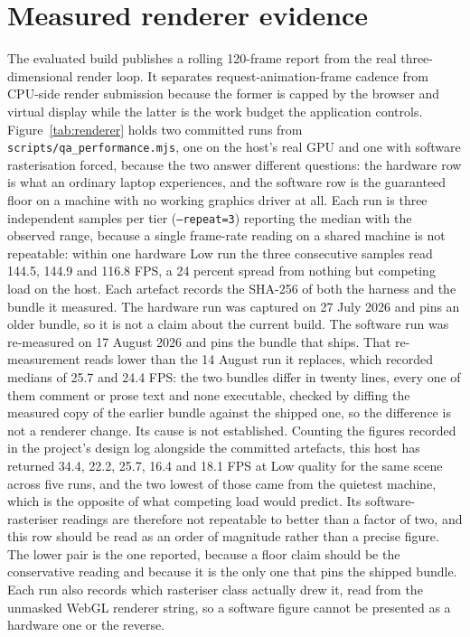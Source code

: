 \documentclass[11pt,a4paper]{report}
\begin{document}
\section{Measured renderer evidence}
\label{sec:renderer}
The evaluated build publishes a rolling 120-frame report from the real three-dimensional render loop. It separates request-animation-frame cadence from CPU-side render submission because the former is capped by the browser and virtual display while the latter is the work budget the application controls. Figure~\ref{tab:renderer} holds two committed runs from \texttt{scripts/qa\_performance.mjs}, one on the host's real GPU and one with software rasterisation forced, because the two answer different questions: the hardware row is what an ordinary laptop experiences, and the software row is the guaranteed floor on a machine with no working graphics driver at all. Each run is three independent samples per tier (\texttt{--repeat=3}) reporting the median with the observed range, because a single frame-rate reading on a shared machine is not repeatable: within one hardware Low run the three consecutive samples read 144.5, 144.9 and 116.8 FPS, a 24 percent spread from nothing but competing load on the host. Each artefact records the SHA-256 of both the harness and the bundle it measured. The hardware run was captured on 27 July 2026 and pins an older bundle, so it is not a claim about the current build. The software run was re-measured on 17 August 2026 and pins the bundle that ships. That re-measurement reads lower than the 14 August run it replaces, which recorded medians of 25.7 and 24.4 FPS: the two bundles differ in twenty lines, every one of them comment or prose text and none executable, checked by diffing the measured copy of the earlier bundle against the shipped one, so the difference is not a renderer change. Its cause is not established. Counting the figures recorded in the project's design log alongside the committed artefacts, this host has returned 34.4, 22.2, 25.7, 16.4 and 18.1 FPS at Low quality for the same scene across five runs, and the two lowest of those came from the quietest machine, which is the opposite of what competing load would predict. Its software-rasteriser readings are therefore not repeatable to better than a factor of two, and this row should be read as an order of magnitude rather than a precise figure. The lower pair is the one reported, because a floor claim should be the conservative reading and because it is the only one that pins the shipped bundle. Each run also records which rasteriser class actually drew it, read from the unmasked WebGL renderer string, so a software figure cannot be presented as a hardware one or the reverse.
\end{document}
